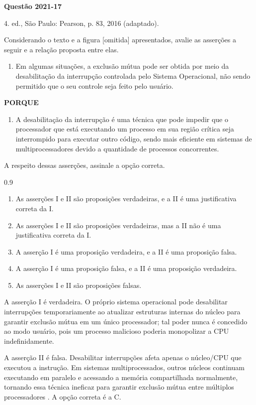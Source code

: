 \documentclass[12pt,a4paper]{article}
\newenvironment{Question}[1]{%
    \pdfbookmark[3]{Questão #1}{q:#1}
    \label{q:#1}
    \par\bigskip\noindent
    \textbf{Questão #1} \dotfill
    \par\noindent
    \nopagebreak
    \ignorespaces
}{%
    \noindent\dotfill
}
\newenvironment{QuestionOptions}{%
    \begin{spacing}{0.9}%
    \small
    \begin{enumerate}[label=\Alph*)]
}{%
    \end{enumerate}
    \end{spacing}
}
\begin{document}
\begin{Question}{2021-17}
\begin{flushright}
    4. ed., São Paulo: Pearson, p. 83, 2016 (adaptado).
\end{flushright}
Considerando o texto e a figura [omitida] apresentados, avalie as asserções a seguir e a relação proposta entre elas.
\begin{enumerate}[label=\Roman*.]
    \item Em algumas situações, a exclusão mútua pode ser obtida por meio da desabilitação da interrupção controlada pelo Sistema Operacional,
    não sendo permitido que o seu controle seja feito pelo usuário.
\end{enumerate}
\begin{center}\textbf{PORQUE}\end{center}
\begin{enumerate}[label=\Roman*.,start=2]
    \item A desabilitação da interrupção é uma técnica que pode impedir que o processador que está executando um processo
    em sua região crítica seja interrompido para executar outro código,
    sendo mais eficiente em sistemas de multiprocessadores devido a quantidade de processos concorrentes.
\end{enumerate}
A respeito dessas asserções, assinale a opção correta.
\begin{QuestionOptions}
    \item As asserções I e II são proposições verdadeiras, e a II é uma justificativa correta da I.
    \item As asserções I e II são proposições verdadeiras, mas a II não é uma justificativa correta da I.
    \item A asserção I é uma proposição verdadeira, e a II é uma proposição falsa.
    \item A asserção I é uma proposição falsa, e a II é uma proposição verdadeira.
    \item As asserções I e II são proposições falsas.
\end{QuestionOptions}
\end{Question}

A asserção I é verdadeira.
O próprio sistema operacional pode desabilitar interrupções temporariamente ao atualizar estruturas internas do núcleo
para garantir exclusão mútua em um único processador;
tal poder nunca é concedido ao modo usuário, pois um processo malicioso poderia monopolizar a CPU indefinidamente.

A asserção II é falsa.
Desabilitar interrupções afeta apenas o núcleo/CPU que executou a instrução.
Em sistemas multiprocessados, outros núcleos continuam executando em paralelo e acessando a memória compartilhada normalmente,
tornando essa técnica ineficaz para garantir exclusão mútua entre múltiplos processadores \parencite[seç.~2.3.1--3]{tanenbaum2016}.
A opção correta é a C.

\printbibliography[heading=bibintoc]
\end{document}
